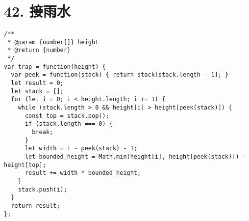\newpage
\section{42. 接雨水}
\label{leetcode:42}

\begin{verbatim}
/**
 * @param {number[]} height
 * @return {number}
 */
var trap = function(height) {
  var peek = function(stack) { return stack[stack.length - 1]; }
  let result = 0;
  let stack = [];
  for (let i = 0; i < height.length; i += 1) {
    while (stack.length > 0 && height[i] > height[peek(stack)]) {
      const top = stack.pop();
      if (stack.length === 0) {
        break;
      }
      let width = i - peek(stack) - 1;
      let bounded_height = Math.min(height[i], height[peek(stack)]) - height[top];
      result += width * bounded_height;
    }
    stack.push(i);
  }
  return result;
};
\end{verbatim}
